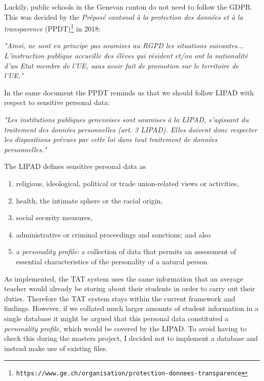 \documentclass[10pt]{article}
\begin{document}
Luckily, public schools in the Genevan canton do not need to follow the GDPR. This was decided by the \emph{Préposé cantonal à la protection des données et à la transparence} (PPDT)\footnote{\texttt{https://www.ge.ch/organisation/protection-donnees-transparence}} in 2018:
\begin{center} 
\emph{"Ainsi, ne sont en principe pas soumises au RGPD les situations suivantes... L’instruction publique accueille des élèves qui résident et/ou ont la nationalité d’un Etat membre de l’UE, sans avoir fait de promotion sur le territoire de l’UE."}\cite[p. 3]{PPDT18}
\end{center}
In the same document the PPDT reminds us that we should follow LIPAD with respect to sensitive personal data:
\begin{center} 
\emph{"Les institutions publiques genevoises sont soumises à la LIPAD, s'agissant du traitement des données personnelles (art. 3 LIPAD). Elles doivent donc respecter les dispositions prévues par cette loi dans tout traitement de données personnelles."}\cite[p. 1]{PPDT18}
\end{center}
The LIPAD defines sensitive personal data as
\begin{enumerate}
\item religious, ideological, political or trade union-related views or activities,
\item health, the intimate sphere or the racial origin,
\item social security measures,
\item administrative or criminal proceedings and sanctions; and also
\item a \emph{personality profile}: a collection of data that permits an assessment of essential characteristics of the personality of a natural person.
\end{enumerate}

As implemented, the TAT system uses the same information that an average teacher would already be storing about their students in order to carry out their duties. Therefore the TAT system stays within the current framework and findings. However, if we collated much larger amounts of student information in a single database it might be argued that this personal data constituted a \emph{personality profile}, which would be covered by the LIPAD. To avoid having to check this during the masters project, I decided not to implement a database and instead make use of existing files.
\end{document}
